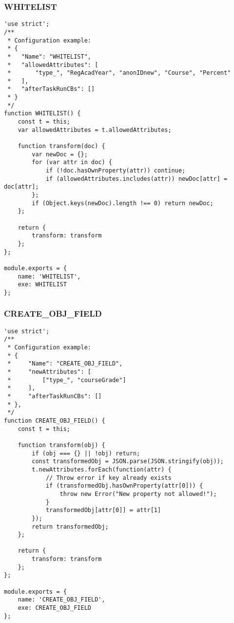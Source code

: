 \subsubsection{WHITELIST}
\label{netl-trans-whitelist}
\begin{verbatim}
'use strict';
/**
 * Configuration example:
 * {
 *   "Name": "WHITELIST",
 *   "allowedAttributes": [
 *       "type_", "RegAcadYear", "anonIDnew", "Course", "Percent"
 *   ],
 *   "afterTaskRunCBs": []
 * } 
 */
function WHITELIST() {
    const t = this;
    var allowedAttributes = t.allowedAttributes;

    function transform(doc) {
        var newDoc = {};
        for (var attr in doc) {
            if (!doc.hasOwnProperty(attr)) continue;
            if (allowedAttributes.includes(attr)) newDoc[attr] = doc[attr];
        };
        if (Object.keys(newDoc).length !== 0) return newDoc;
    };

    return {
        transform: transform
    };
};

module.exports = {
    name: 'WHITELIST',
    exe: WHITELIST
};
\end{verbatim}

\subsubsection{CREATE\_OBJ\_FIELD}
\label{netl-trans-create-obj-field}
\begin{verbatim}
'use strict';
/**
 * Configuration example:
 * {
 *     "Name": "CREATE_OBJ_FIELD",
 *     "newAttributes": [
 *         ["type_", "courseGrade"]
 *     ],
 *     "afterTaskRunCBs": []
 * },
 */
function CREATE_OBJ_FIELD() {
    const t = this;

    function transform(obj) {
        if (obj === {} || !obj) return;
        const transformedObj = JSON.parse(JSON.stringify(obj));
        t.newAttributes.forEach(function(attr) {
            // Throw error if key already exists
            if (transformedObj.hasOwnProperty(attr[0])) {
                throw new Error("New property not allowed!");
            }
            transformedObj[attr[0]] = attr[1]
        });
        return transformedObj;
    };

    return {
        transform: transform
    };
};

module.exports = {
    name: 'CREATE_OBJ_FIELD',
    exe: CREATE_OBJ_FIELD
};
\end{verbatim}